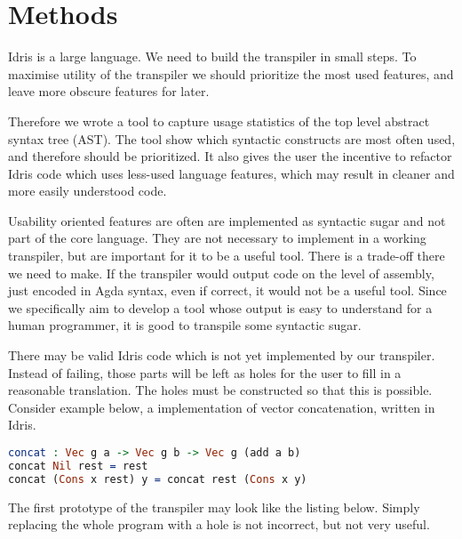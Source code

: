 \chapter{Methods}

Idris is a large language. We need to build the transpiler in small steps. To
maximise utility of the transpiler we should prioritize the most used features,
and leave more obscure features for later.

Therefore we wrote a tool to capture usage statistics of the top level abstract
syntax tree (AST). The tool show which syntactic constructs are most often
used, and therefore should be prioritized. It also gives the user the
incentive to refactor Idris code which uses less-used language features,
which may result in cleaner and more easily understood code.

Usability oriented features are often are implemented as syntactic sugar and
not part of the core language. They are not necessary to implement in a working
transpiler, but are important for it to be a useful tool. There is a trade-off
there we need to make. If the transpiler would output code on the level of
assembly, just encoded in Agda syntax, even if correct, it would not be a useful
tool. Since we specifically aim to develop a tool whose output is easy to
understand for a human programmer, it is good to transpile some syntactic sugar.



There may be valid Idris code which is not yet implemented by our transpiler.
Instead of failing, those parts will be left as holes for the user to fill in
a reasonable translation.
The holes must be constructed so that this is possible.
Consider example below, a implementation of vector concatenation, written in
Idris.

\begin{lstlisting}[language=Idris,label={lst:hole1},caption={}]
concat : Vec g a -> Vec g b -> Vec g (add a b)
concat Nil rest = rest
concat (Cons x rest) y = concat rest (Cons x y)
\end{lstlisting}

The first prototype of the transpiler may look like the listing below.
Simply replacing the whole program with a hole is not incorrect, but not very
useful.

